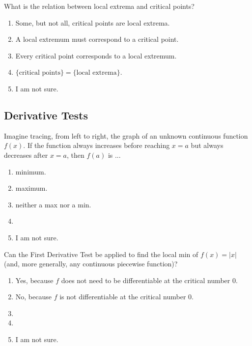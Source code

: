 \documentclass[aspectratio=169, 14pt, t]{beamer}  %
\begin{document}
\begin{poll}
  What is the relation between local extrema and critical points?

  \begin{enumerate} \setlength\itemsep{1ex}
    \item Some, but not all, critical points are local extrema.
    \item A local extremum must correspond to a critical point.
    \item Every critical point corresponds to a local extremum.
    \item \(\{ \text{critical points} \} = \{ \text{local extrema} \}\).
    \item I am not sure.
  \end{enumerate}
\end{poll}

\subsection{Derivative Tests}

\begin{poll}
  Imagine tracing, from left to right, the graph of an unknown continuous function \(f(x)\).  If the function always increases before reaching \(x = a\) but always decreases after \(x = a\), then \(f(a)\) is ...

  \begin{enumerate}
    \item minimum.
    \item maximum.
    \item neither a max nor a min.
    \item
    \item I am not sure.
  \end{enumerate}
\end{poll}

\begin{poll}
  Can the First Derivative Test be applied to find the local min of \(f(x) = |x|\) (and, more generally, any continuous piecewise function)?

  \begin{enumerate}
    \item Yes, because \(f\) does not need to be differentiable at the critical number \(0\).
    \item No, because \(f\) is not differentiable at the critical number \(0\).
    \item
    \item
    \item I am not sure.
  \end{enumerate}
\end{poll}
\end{document}
